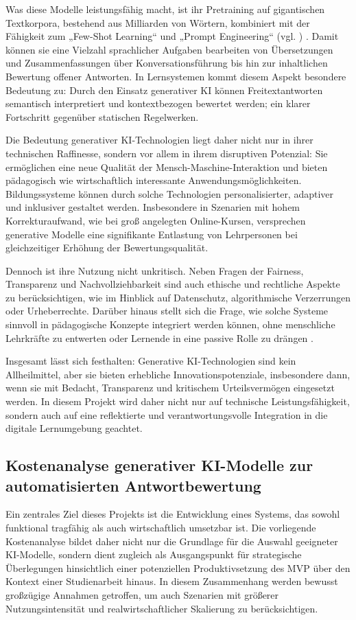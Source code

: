 \documentclass[a4paper,12pt]{article}
\begin{document}
Was diese Modelle leistungsfähig macht, ist ihr Pretraining auf gigantischen Textkorpora, bestehend aus Milliarden von Wörtern, kombiniert mit der Fähigkeit zum „Few-Shot Learning“ und „Prompt Engineering“ (vgl. \textcite{brown}) . Damit können sie eine Vielzahl sprachlicher Aufgaben bearbeiten von Übersetzungen und Zusammenfassungen über Konversationsführung bis hin zur inhaltlichen Bewertung offener Antworten. In Lernsystemen kommt diesem Aspekt besondere Bedeutung zu: Durch den Einsatz generativer KI können Freitextantworten semantisch interpretiert und kontextbezogen bewertet werden; ein klarer Fortschritt gegenüber statischen Regelwerken.

Die Bedeutung generativer KI-Technologien liegt daher nicht nur in ihrer technischen Raffinesse, sondern vor allem in ihrem disruptiven Potenzial: Sie ermöglichen eine neue Qualität der Mensch-Maschine-Interaktion und bieten pädagogisch wie wirtschaftlich interessante Anwendungsmöglichkeiten. Bildungssysteme können durch solche Technologien personalisierter, adaptiver und inklusiver gestaltet werden. Insbesondere in Szenarien mit hohem Korrekturaufwand, wie bei groß angelegten Online-Kursen, versprechen generative Modelle eine signifikante Entlastung von Lehrpersonen bei gleichzeitiger Erhöhung der Bewertungsqualität.

Dennoch ist ihre Nutzung nicht unkritisch. Neben Fragen der Fairness, Transparenz und Nachvollziehbarkeit sind auch ethische und rechtliche Aspekte zu berücksichtigen, wie im Hinblick auf Datenschutz, algorithmische Verzerrungen oder Urheberrechte. Darüber hinaus stellt sich die Frage, wie solche Systeme sinnvoll in pädagogische Konzepte integriert werden können, ohne menschliche Lehrkräfte zu entwerten oder Lernende in eine passive Rolle zu drängen \parencite{luckin}.

Insgesamt lässt sich festhalten: Generative KI-Technologien sind kein Allheilmittel, aber sie bieten erhebliche Innovationspotenziale, insbesondere dann, wenn sie mit Bedacht, Transparenz und kritischem Urteilsvermögen eingesetzt werden. In diesem Projekt wird daher nicht nur auf technische Leistungsfähigkeit, sondern auch auf eine reflektierte und verantwortungsvolle Integration in die digitale Lernumgebung geachtet.

\subsection{Kostenanalyse generativer KI-Modelle zur automatisierten Antwortbewertung}
Ein zentrales Ziel dieses Projekts ist die Entwicklung eines Systems, das sowohl funktional tragfähig als auch wirtschaftlich umsetzbar ist. Die vorliegende Kostenanalyse bildet daher nicht nur die Grundlage für die Auswahl geeigneter KI-Modelle, sondern dient zugleich als Ausgangspunkt für strategische Überlegungen hinsichtlich einer potenziellen Produktivsetzung des MVP über den Kontext einer Studienarbeit hinaus. In diesem Zusammenhang werden bewusst großzügige Annahmen getroffen, um auch Szenarien mit größerer Nutzungsintensität und realwirtschaftlicher Skalierung zu berücksichtigen.
\end{document}
